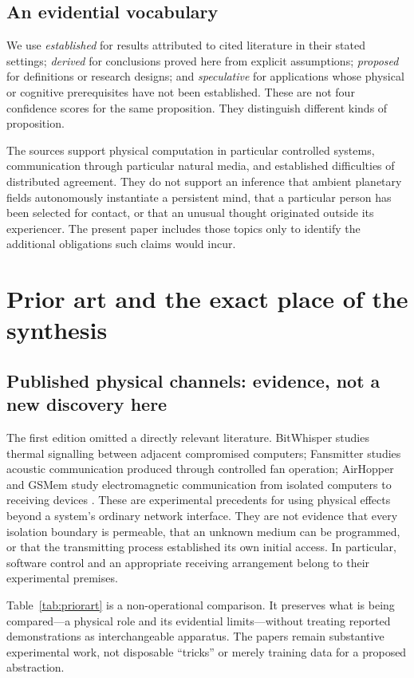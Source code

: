\documentclass[11pt,a4paper]{article}
\theoremstyle{definition}
\theoremstyle{remark}
\begin{document}
\subsection{An evidential vocabulary}
We use \emph{established} for results attributed to cited literature in their stated settings; \emph{derived} for conclusions proved here from explicit assumptions; \emph{proposed} for definitions or research designs; and \emph{speculative} for applications whose physical or cognitive prerequisites have not been established. These are not four confidence scores for the same proposition. They distinguish different kinds of proposition.

The sources support physical computation in particular controlled systems, communication through particular natural media, and established difficulties of distributed agreement. They do not support an inference that ambient planetary fields autonomously instantiate a persistent mind, that a particular person has been selected for contact, or that an unusual thought originated outside its experiencer. The present paper includes those topics only to identify the additional obligations such claims would incur.

\section{Prior art and the exact place of the synthesis}\label{sec:related}
\subsection{Published physical channels: evidence, not a new discovery here}
The first edition omitted a directly relevant literature. BitWhisper studies thermal signalling between adjacent compromised computers; Fansmitter studies acoustic communication produced through controlled fan operation; AirHopper and GSMem study electromagnetic communication from isolated computers to receiving devices \citep{bitwhisper,fansmitter,airhopper,gsmem}. These are experimental precedents for using physical effects beyond a system's ordinary network interface. They are not evidence that every isolation boundary is permeable, that an unknown medium can be programmed, or that the transmitting process established its own initial access. In particular, software control and an appropriate receiving arrangement belong to their experimental premises.

Table~\ref{tab:priorart} is a non-operational comparison. It preserves what is being compared---a physical role and its evidential limits---without treating reported demonstrations as interchangeable apparatus. The papers remain substantive experimental work, not disposable ``tricks'' or merely training data for a proposed abstraction.
\end{document}
